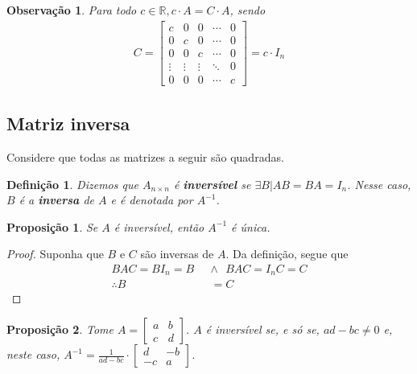\documentclass{article}
\newtheorem*{remark}{Observação}
\newtheorem*{definition}{Definição}
\newtheorem*{proposition}{Proposição}
\begin{document}
\begin{remark}
	Para todo $c\in\mathbb{R}, c\cdot A = C\cdot A$, sendo
	\begin{align*}
	C = \begin{bmatrix}
	c & 0 & 0 &\cdots & 0 \\
	0 & c & 0 &\cdots & 0 \\
	0 & 0 & c & \cdots & 0 \\
	\vdots & \vdots & \vdots & \ddots & 0 \\
	0 & 0 & 0 &\cdots & c 
	\end{bmatrix} = c\cdot I_n
	\end{align*} 
	
\end{remark}

\subsection{Matriz inversa}
\hspace{12pt} Considere que todas as matrizes a seguir são quadradas.

\begin{definition}
	Dizemos que $A_{n\times n}$ é \textbf{inversível} se $\exists B| AB = BA = I_n$. Nesse caso, $B$ é a \textbf{inversa} de $A$ e é denotada por $A^{-1}$.
\end{definition}

\begin{proposition}
	Se $A$ é inversível, então $A^{-1}$ é única.
\end{proposition}

\begin{proof}
	Suponha que $B$ e $C$ são inversas de $A$. Da definição, segue que
	\begin{align*}
	BAC = BI_n = B \text{ } &\wedge \text{ } BAC = I_nC = C \\
	\therefore B &= C
	\end{align*}
\end{proof}

\begin{proposition}
	Tome $\displaystyle{A = \begin{bmatrix}
		a & b \\
		c & d
		\end{bmatrix}}$. $A$ é inversível se, e só se, $ad - bc\neq 0$ e, neste caso, $\displaystyle{A^{-1} = \frac{1}{ad - bc}\cdot\begin{bmatrix}
		d & -b \\
		-c & a
		\end{bmatrix}}$.
\end{proposition}
\end{document}

